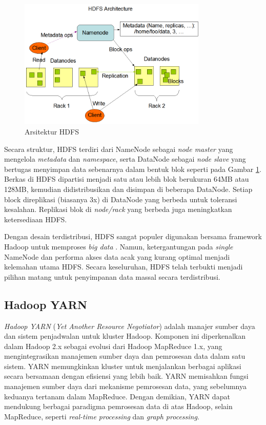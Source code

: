 \begin{figure}[h!]
    \centering
    \includegraphics[width=0.8\textwidth]{figures/ch02/hdfsarchitecture}
    \caption{Arsitektur HDFS \cite{ApacheHadoopHDFS}}
    \label{fig:hdfs-arch}
\end{figure}

Secara struktur, HDFS terdiri dari NameNode sebagai \textit{node master} yang mengelola \textit{metadata} dan \textit{namespace}, serta DataNode sebagai \textit{node slave} yang bertugas menyimpan data sebenarnya dalam bentuk blok seperti pada Gambar \ref{fig:hdfs-arch}. Berkas di HDFS dipartisi menjadi satu atau lebih blok berukuran 64MB atau 128MB, kemudian didistribusikan dan disimpan di beberapa DataNode. Setiap block direplikasi (biasanya 3x) di DataNode yang berbeda untuk toleransi kesalahan. Replikasi blok di \textit{node/rack} yang berbeda juga meningkatkan ketersediaan HDFS.

Dengan desain terdistribusi, HDFS sangat populer digunakan bersama framework Hadoop untuk memproses \textit{big data} \cite{almansouriHadoopDistributedFile2019}. Namun, ketergantungan pada \textit{single} NameNode dan performa akses data acak yang kurang optimal menjadi kelemahan utama HDFS. Secara keseluruhan, HDFS telah terbukti menjadi pilihan matang untuk penyimpanan data massal secara terdistribusi.

\subsection{Hadoop YARN}
\textit{Hadoop YARN} (\textit{Yet Another Resource Negotiator}) adalah manajer sumber daya dan sistem penjadwalan untuk kluster Hadoop. Komponen ini diperkenalkan dalam Hadoop 2.x sebagai evolusi dari Hadoop MapReduce 1.x, yang mengintegrasikan manajemen sumber daya dan pemrosesan data dalam satu sistem. YARN memungkinkan kluster untuk menjalankan berbagai aplikasi secara bersamaan dengan efisiensi yang lebih baik.  YARN memisahkan fungsi manajemen sumber daya dari mekanisme pemrosesan data, yang sebelumnya keduanya tertanam dalam MapReduce. Dengan demikian, YARN dapat mendukung berbagai paradigma pemrosesan data di atas Hadoop, selain MapReduce, seperti \textit{real-time processing} dan \textit{graph processing}.

